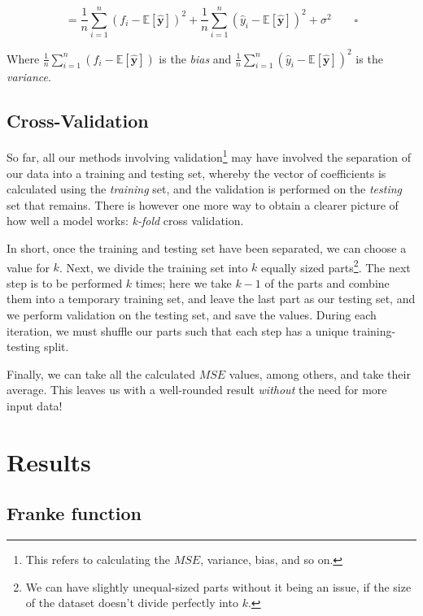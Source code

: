 \documentclass[a4paper,10pt,english]{article}
\begin{document}
\begin{equation*}
= \frac{1}{n} \sum_{i=1}^{n} ( f_i - \mathbb{E}[\hat{\mathbf{y}}] )^2 
+ \frac{1}{n} \sum_{i=1}^{n} ( \hat{y}_i - \mathbb{E}[\hat{\mathbf{y}}] )^2 
+ \sigma^2 \qquad \square
\end{equation*}

Where $\frac{1}{n} \sum_{i=1}^{n} ( f_i - \mathbb{E}[\hat{\mathbf{y}}] )$ is the \textit{bias} and
$\frac{1}{n} \sum_{i=1}^{n} ( \hat{y}_i - \mathbb{E}[\hat{\mathbf{y}}] )^2$ is the \textit{variance}.	

\subsection*{Cross-Validation}

So far, all our methods involving validation\footnote{This refers to calculating the $MSE$, variance, bias, and so on.} may have involved the separation of our data into a training and testing set, whereby the vector of coefficients is calculated using the \textit{training} set, and the validation is performed on the \textit{testing} set that remains.	There is however one more way to obtain a clearer picture of how well a model works: \textit{k-fold} cross validation.	

In short, once the training and testing set have been separated, we can choose a value for $k$.  Next, we divide the training set into $k$ equally sized parts\footnote{We can have slightly unequal-sized parts without it being an issue, if the size of the dataset doesn't divide perfectly into $k$.}.  The next step is to be performed $k$ times; here we take $k-1$ of the parts and combine them into a temporary training set, and leave the last part as our testing set, and we perform validation on the testing set, and save the values.  During each iteration, we must shuffle our parts such that each step has a unique training-testing split.

Finally, we can take all the calculated $MSE$ values, among others, and take their average.  This leaves us with a well-rounded result \textit{without} the need for more input data!

\section*{Results}
\label{sec:results}

\subsection*{Franke function}
\end{document}
